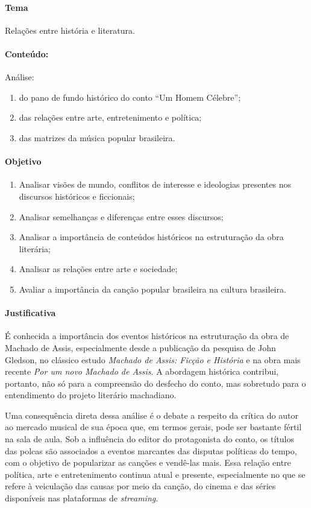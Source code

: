 \documentclass[12pt]{extarticle}
\begin{document}
\paragraph{Tema} Relações entre história e literatura.

\paragraph{Conteúdo:} Análise:
\begin{enumerate}
\item
do pano de fundo histórico do conto ``Um Homem Célebre''; 
\item
das relações entre arte, entretenimento e política; 
\item
das matrizes da música popular brasileira.
\end{enumerate}

\paragraph{Objetivo}
\begin{enumerate}
\item
Analisar visões de mundo, conflitos de interesse e
ideologias presentes nos discursos históricos e ficcionais; 
\item
Analisar
semelhanças e diferenças entre esses discursos; 
\item
Analisar a importância de conteúdos históricos na estruturação da obra literária;
\item
Analisar as relações entre arte e sociedade; 
\item
Avaliar a importância da canção popular brasileira na cultura brasileira.
\end{enumerate}

\paragraph{Justificativa} É conhecida a importância dos eventos históricos
na estruturação da obra de Machado de Assis, especialmente desde a
publicação da pesquisa de John Gledson, no clássico estudo \emph{Machado
de Assis: Ficção e História} e na obra mais recente \emph{Por um novo
Machado de Assis}. A abordagem histórica contribui, portanto, não só
para a compreensão do desfecho do conto, mas sobretudo para o
entendimento do projeto literário machadiano.

Uma consequência direta dessa análise é o debate a respeito da crítica
do autor ao mercado musical de sua época que, em termos gerais, pode ser
bastante fértil na sala de aula. Sob a influência do editor do
protagonista do conto, os títulos das polcas são associados a eventos
marcantes das disputas políticas do tempo, com o objetivo de popularizar
as canções e vendê-las mais. Essa relação entre política, arte e
entretenimento continua atual e presente, especialmente no que se refere
à veiculação das causas por meio da canção, do cinema e das séries
disponíveis nas plataformas de \emph{streaming}.
\end{document}
